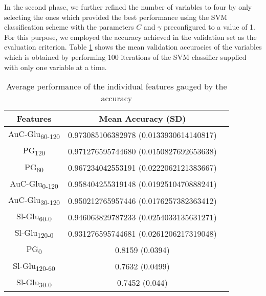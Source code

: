 \documentclass[journal,comsoc]{IEEEtran}
\renewcommand{\^}{\hat}  %
\begin{document}
In the second phase, we further refined the number of variables to four by only selecting the ones which provided the best performance using the SVM classification scheme with the parameters $C$ and $\gamma$ preconfigured to a value of \num{1}. For this purpose, we employed the accuracy achieved in the validation set as the evaluation criterion. Table \ref{tab:best_features} shows the mean validation accuracies of the variables which is  obtained by performing \num{100} iterations of the SVM classifier supplied with only one variable at a time.
\begin{table}[!htbp]
  \centering
  \renewcommand{\arraystretch}{1.3}
  \caption{Average performance of the individual features gauged by the accuracy}
  \centering
  \begin{tabular}{c c c}
    \toprule
    Features &  Mean Accuracy (SD)\\
    \midrule \midrule
    \rowcolor{green!25} AuC-Glu\textsubscript{60-120}	& \num{0.973085106382978}	(\num{0.0133930614140817})\\
    \rowcolor{green!25} PG\textsubscript{120}	& \num{0.971276595744680}	(\num{0.0150827692653638})\\
    \rowcolor{green!25} PG\textsubscript{60}	& \num{0.967234042553191}	(\num{0.0222062121383667})\\
    \rowcolor{green!25} AuC-Glu\textsubscript{0-120}	& \num{0.958404255319148}	(\num{0.0192510470888241})\\
    AuC-Glu\textsubscript{30-120}	& \num{0.950212765957446}	(\num{0.0176257382363412}) \\
    Sl-Glu\textsubscript{60-0}	& \num{0.946063829787233}	(\num{0.0254033135631271})\\
    Sl-Glu\textsubscript{120-0}	& \num{0.931276595744681}	(\num{0.0261206217319048})\\
    PG\textsubscript{0}	& \num{0.8159}	(\num{0.0394})\\
    Sl-Glu\textsubscript{120-60}	& \num{0.7632}	(\num{0.0499})\\
    Sl-Glu\textsubscript{30-0}	& \num{0.7452}	(\num{0.044})\\
    \bottomrule
  \end{tabular}
  \label{tab:best_features}
\end{table}
%
\end{document}
